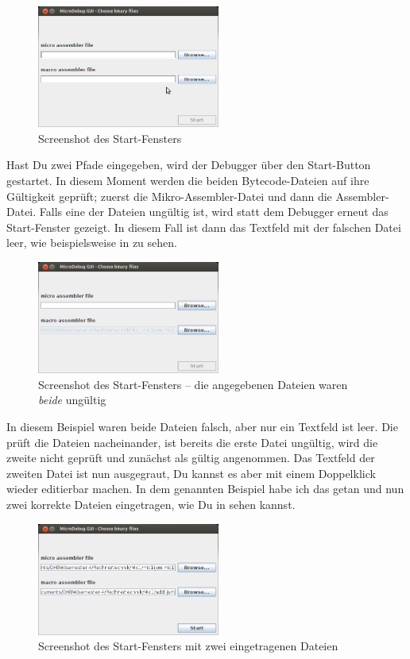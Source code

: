 \begin{figure}[h]
	\centering
	\includegraphics[width=6cm]{images/start-frame-empty}
	\caption{Screenshot des Start-Fensters}
\end{figure}

Hast Du zwei Pfade eingegeben, wird der Debugger über den Start-Button gestartet. In diesem Moment werden die beiden Bytecode-Dateien auf ihre Gültigkeit geprüft; zuerst die Mikro-Assembler-Datei und dann die Assembler-Datei. Falls eine der Dateien ungültig ist, wird statt dem Debugger erneut das Start-Fenster gezeigt. In diesem Fall ist dann das Textfeld mit der falschen Datei leer, wie beispielsweise in  zu sehen.

\begin{figure}[h]
	\centering
	\includegraphics[width=6cm]{images/start-frame-both-wrong}
	\caption{Screenshot des Start-Fensters -- die angegebenen Dateien waren \emph{beide} ungültig}
\end{figure}

In diesem Beispiel waren beide Dateien falsch, aber nur ein Textfeld ist leer. Die \mdg{} prüft die Dateien nacheinander, ist bereits die erste Datei ungültig, wird die zweite nicht geprüft und zunächst als gültig angenommen. Das Textfeld der zweiten Datei ist nun ausgegraut, Du kannst es aber mit einem Doppelklick wieder editierbar machen. In dem genannten Beispiel habe ich das getan und nun zwei korrekte Dateien eingetragen, wie Du in  sehen kannst.

\begin{figure}[h]
	\centering
	\includegraphics[width=6cm]{images/start-frame-both-filled}
	\caption{Screenshot des Start-Fensters mit zwei eingetragenen Dateien}
\end{figure}

